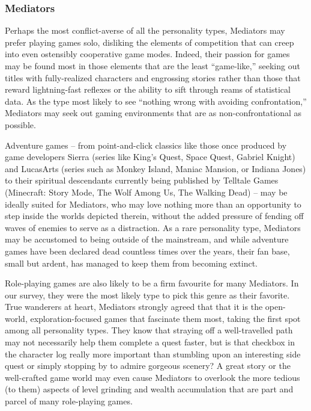 \documentclass{article}
\begin{document}
\subsubsection{Mediators}
Perhaps the most conflict-averse of all the personality types, Mediators may prefer playing games solo, disliking the elements of competition that can creep into even ostensibly cooperative game modes. Indeed, their passion for games may be found most in those elements that are the least “game-like,” seeking out titles with fully-realized characters and engrossing stories rather than those that reward lightning-fast reflexes or the ability to sift through reams of statistical data. As the type most likely to see “nothing wrong with avoiding confrontation,” Mediators may seek out gaming environments that are as non-confrontational as possible.

Adventure games – from point-and-click classics like those once produced by game developers Sierra (series like King’s Quest, Space Quest, Gabriel Knight) and LucasArts (series such as Monkey Island, Maniac Mansion, or Indiana Jones) to their spiritual descendants currently being published by Telltale Games (Minecraft: Story Mode, The Wolf Among Us, The Walking Dead) – may be ideally suited for Mediators, who may love nothing more than an opportunity to step inside the worlds depicted therein, without the added pressure of fending off waves of enemies to serve as a distraction. As a rare personality type, Mediators may be accustomed to being outside of the mainstream, and while adventure games have been declared dead countless times over the years, their fan base, small but ardent, has managed to keep them from becoming extinct.

Role-playing games are also likely to be a firm favourite for many Mediators. In our survey, they were the most likely type to pick this genre as their favorite. True wanderers at heart, Mediators strongly agreed that that it is the open-world, exploration-focused games that fascinate them most, taking the first spot among all personality types. They know that straying off a well-travelled path may not necessarily help them complete a quest faster, but is that checkbox in the character log really more important than stumbling upon an interesting side quest or simply stopping by to admire gorgeous scenery? A great story or the well-crafted game world may even cause Mediators to overlook the more tedious (to them) aspects of level grinding and wealth accumulation that are part and parcel of many role-playing games.
\end{document}
